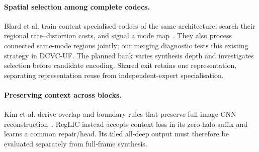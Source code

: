 \paragraph{Spatial selection among complete codecs.}
Blard et al. train content-specialised codecs of the same architecture,
search their regional rate--distortion costs, and signal a mode
map~\cite{blard2026spatial}. They also process connected same-mode regions
jointly; our merging diagnostic tests this existing strategy in DCVC-UF.
The planned bank varies synthesis depth and investigates selection before
candidate encoding. Shared exit retains one representation, separating
representation reuse from independent-expert specialisation.

\paragraph{Preserving context across blocks.}
Kim et al. derive overlap and boundary rules that preserve full-image
CNN reconstruction~\cite{kim2026blockwise}. RegLIC instead accepts
context loss in its zero-halo suffix and learns a common repair/head.
Its tiled all-deep output must therefore be evaluated separately from
full-frame synthesis.
